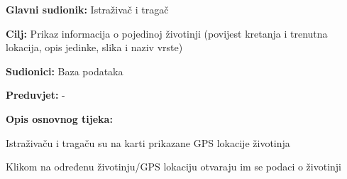 					\noindent {}
					\begin{packed_item}
						
						\item \textbf{Glavni sudionik: } Istraživač i tragač
						\item  \textbf{Cilj:} Prikaz informacija o pojedinoj životinji (povijest kretanja i trenutna lokacija, opis jedinke, slika i naziv vrste)
						\item  \textbf{Sudionici:} Baza podataka
						\item  \textbf{Preduvjet:} -
						\item  \textbf{Opis osnovnog tijeka:}
						
						\item[] \begin{packed_enum}
							
							\item Istraživaču i tragaču su na karti prikazane GPS lokacije životinja
							\item Klikom na određenu životinju/GPS lokaciju otvaraju im se podaci o životinji
						\end{packed_enum}
						
					\end{packed_item}
					
